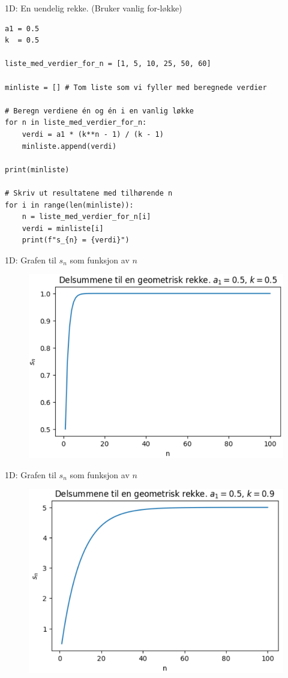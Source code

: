 \cyanheader
\begin{frame}[fragile]{1D: En uendelig rekke. (Bruker vanlig for-løkke)}
\begin{verbatim}
a1 = 0.5
k  = 0.5

liste_med_verdier_for_n = [1, 5, 10, 25, 50, 60]

minliste = [] # Tom liste som vi fyller med beregnede verdier

# Beregn verdiene én og én i en vanlig løkke
for n in liste_med_verdier_for_n:
    verdi = a1 * (k**n - 1) / (k - 1)
    minliste.append(verdi)

print(minliste)

# Skriv ut resultatene med tilhørende n
for i in range(len(minliste)):
    n = liste_med_verdier_for_n[i]
    verdi = minliste[i]
    print(f"s_{n} = {verdi}")

\end{verbatim}
\medskip
\end{frame}

\cyanheader
\begin{frame}[fragile]{1D:  Grafen til $s_n$ som funksjon av $n$}
\begin{figure}
    \centering
    \includegraphics[width=0.7\linewidth]{R2K1D-2.png}
\end{figure}
\end{frame}

\cyanheader
\begin{frame}[fragile]{1D:  Grafen til $s_n$ som funksjon av $n$}
\begin{figure}
    \centering
    \includegraphics[width=0.7\linewidth]{R2K1D-4.png}
\end{figure}
\end{frame}

